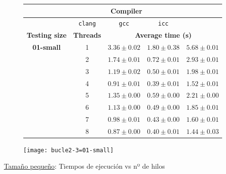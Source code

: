 \begin{figure}[H]
    \centering
    \begin{subfigure}{0.4\textwidth}
        \begin{adjustbox}{width=\textwidth} 
        \begin{tabular}{|c|c|c|c|c|}
            \hline
            \rowcolor{azul} \multicolumn{2}{|c|}{}&\multicolumn{3}{c|}{\textbf{Compiler}} \\ \hline
            \rowcolor{azul} \multicolumn{2}{|c|}{}&\texttt{clang}&\texttt{gcc}&\texttt{icc}\\ \hline
            \rowcolor{azul} \textbf{Testing size} & \textbf{Threads}&\multicolumn{3}{c|}{\textbf{Average time (s)}} \\ \hline
            \multirow{8}{1cm}{\textbf{01-small}} & 1 & \(3.36\pm{0.02}\) & \(1.80\pm{0.38}\) & \(5.68\pm{0.01}\) \\ \cline{2-5}
            & 2 & \(1.74\pm{0.01}\) & \(0.72\pm{0.01}\) & \(2.93\pm{0.01}\) \\ \cline{2-5}
            & 3 & \(1.19\pm{0.02}\) & \(0.50\pm{0.01}\) & \(1.98\pm{0.01}\) \\ \cline{2-5}
            & 4 & \(0.91\pm{0.01}\) & \(0.39\pm{0.01}\) & \(1.52\pm{0.01}\) \\ \cline{2-5}
            & 5 & \(1.35\pm{0.00}\) & \(0.59\pm{0.00}\) & \(2.21\pm{0.00}\) \\ \cline{2-5}
            & 6 & \(1.13\pm{0.00}\) & \(0.49\pm{0.00}\) & \(1.85\pm{0.01}\) \\ \cline{2-5}
            & 7 & \(0.98\pm{0.01}\) & \(0.43\pm{0.00}\) & \(1.60\pm{0.01}\) \\ \cline{2-5}
            & 8 & \(0.87\pm{0.00}\) & \(0.40\pm{0.01}\) & \(1.44\pm{0.03}\) \\ \hline
        \end{tabular}
        \end{adjustbox}
    \end{subfigure}
    \hfill
    \begin{subfigure}{0.5\textwidth}
        \texttt{[image: bucle2-3=01-small]}
    \end{subfigure}
    \caption{\underline{Tamaño pequeño}: Tiempos de ejecución vs nº de hilos}
    \label{fig:bucle2-3=01-small}
\end{figure}


